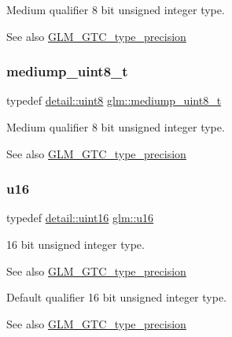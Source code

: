 Medium qualifier 8 bit unsigned integer type. \begin{DoxySeeAlso}{See also}
\hyperlink{group__gtc__type__precision}{G\+L\+M\+\_\+\+G\+T\+C\+\_\+type\+\_\+precision} 
\end{DoxySeeAlso}
\mbox{\label{group__gtc__type__precision_gadfa38f3c245d371c4b2079f1fd68928b}} 
\subsubsection{\texorpdfstring{mediump\+\_\+uint8\+\_\+t}{mediump\_uint8\_t}}
{\footnotesize\ttfamily typedef \hyperlink{namespaceglm_1_1detail_aef2588f97d090cc19fbbe0c74fe17c8f}{detail\+::uint8} \hyperlink{group__gtc__type__precision_gadfa38f3c245d371c4b2079f1fd68928b}{glm\+::mediump\+\_\+uint8\+\_\+t}}

Medium qualifier 8 bit unsigned integer type. \begin{DoxySeeAlso}{See also}
\hyperlink{group__gtc__type__precision}{G\+L\+M\+\_\+\+G\+T\+C\+\_\+type\+\_\+precision} 
\end{DoxySeeAlso}
\mbox{\label{group__gtc__type__precision_gae7a1571503f83d2264ddfa705a6b082a}} 
\subsubsection{\texorpdfstring{u16}{u16}}
{\footnotesize\ttfamily typedef \hyperlink{namespaceglm_1_1detail_a47b2a7d006d187338e8031a352d1ce56}{detail\+::uint16} \hyperlink{group__gtc__type__precision_gae7a1571503f83d2264ddfa705a6b082a}{glm\+::u16}}

16 bit unsigned integer type. \begin{DoxySeeAlso}{See also}
\hyperlink{group__gtc__type__precision}{G\+L\+M\+\_\+\+G\+T\+C\+\_\+type\+\_\+precision}
\end{DoxySeeAlso}
Default qualifier 16 bit unsigned integer type. \begin{DoxySeeAlso}{See also}
\hyperlink{group__gtc__type__precision}{G\+L\+M\+\_\+\+G\+T\+C\+\_\+type\+\_\+precision} 
\end{DoxySeeAlso}
\mbox{\label{group__gtc__type__precision_ga40d9e5ab8120f10efcfd7c88436c4a81}} 
